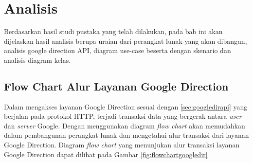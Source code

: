 \chapter{Analisis}
\label{chap:analisis}

Berdasarkan hasil studi pustaka yang telah dilakukan, pada bab ini akan dijelaskan hasil analisis berupa uraian dari perangkat lunak yang akan dibangun, analisis google direction API, diagram use-case beserta dengan skenario dan analisis diagram kelas.

\section{Flow Chart Alur Layanan Google Direction}
\label{sec:flowchartgoogledir}

Dalam mengakses layanan Google Direction sesuai dengan \ref{sec:googledirapi} yang berjalan pada protokol HTTP, terjadi transaksi data yang bergerak antara \textit{user} dan \textit{server} Google. 
Dengan menggunakan diagram \textit{flow chart} akan memudahkan dalam pembangunan perangkat lunak dan mengetahui alur transaksi dari layanan Google Direction. Diagram \textit{flow chart} yang menunjukan alur transaksi layanan Google Direction dapat dilihat pada Gambar \ref{fig:flowchartgoogledir}

